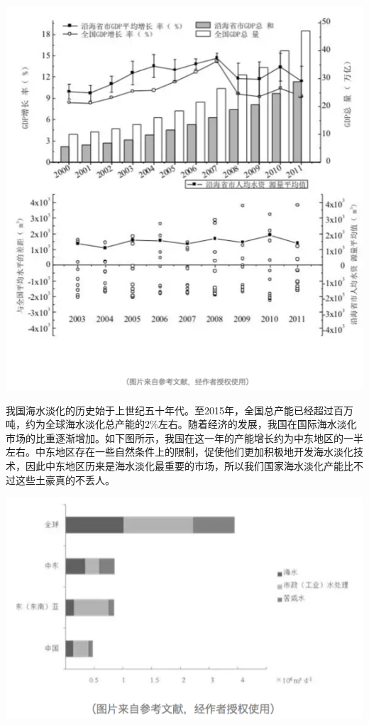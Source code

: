 \documentclass[
]{book}
\begin{document}
\includegraphics[width=7.76in]{images/seawater3}

我国海水淡化的历史始于上世纪五十年代。至2015年，全国总产能已经超过百万吨，约为全球海水淡化总产能的2\%左右。随着经济的发展，我国在国际海水淡化市场的比重逐渐增加。如下图所示，我国在这一年的产能增长约为中东地区的一半左右。中东地区存在一些自然条件上的限制，促使他们更加积极地开发海水淡化技术，因此中东地区历来是海水淡化最重要的市场，所以我们国家海水淡化产能比不过这些土豪真的不丢人。

\includegraphics[width=8.33in]{images/seawater4}
\end{document}
